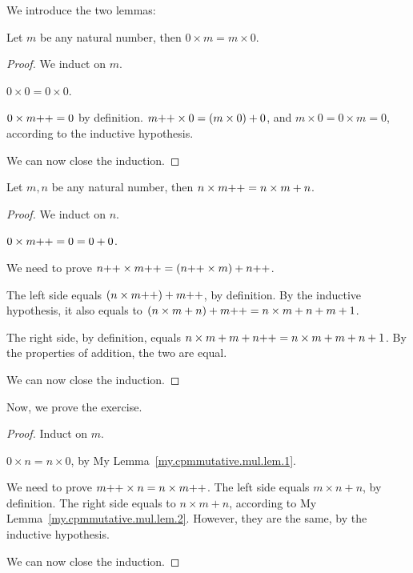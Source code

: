 We introduce the two lemmas:
\begin{lem}\label{my.cpmmutative.mul.lem.1}
	Let $m$ be any natural number, then $0 \times m = m \times 0$.
\end{lem}
\begin{proof}
	We induct on $m$.
	
	\mybcbox $0 \times 0 = 0 \times 0$.
	
	\myisbox $0 \times m{+}{+} = 0$ by definition. $m{+}{+} \times 0 = (m \times 0) + 0$, and $m \times 0 = 0 \times m = 0$, according to the inductive hypothesis.
	
	We can now close the induction.
\end{proof}

\begin{lem}\label{my.cpmmutative.mul.lem.2}
	Let $m, n$ be any natural number, then $n \times m{+}{+} = n \times m + n$.
\end{lem}
\begin{proof}
	We induct on $n$.
	
	\mybcbox $0 \times m{+}{+} = 0 = 0 + 0$.
	
	\myisbox We need to prove $n{+}{+} \times m{+}{+} = (n{+}{+} \times m) + n{+}{+}$.
	
	The left side equals $(n \times m{+}{+}) + m{+}{+}$, by definition. By the inductive hypothesis, it also equals to $(n \times m + n) + m{+}{+} = n \times m + n + m + 1$.
	
	The right side, by definition, equals $n \times m + m + n{+}{+} = n \times m + m +n +1$. By the properties of addition, the two are equal.
	
	We can now close the induction.
\end{proof}

Now, we prove the exercise.
\begin{proof}
	Induct on $m$.
	
	\mybcbox $0 \times n = n \times 0$, by My Lemma~\ref{my.cpmmutative.mul.lem.1}.
	
	\myisbox We need to prove $m{+}{+} \times n = n \times m{+}{+}$. The left side equals $m \times n + n$, by definition. The right side equals to $n \times m + n$, according to My Lemma~\ref{my.cpmmutative.mul.lem.2}. However, they are the same, by the inductive hypothesis.
	
	We can now close the induction.
\end{proof}

